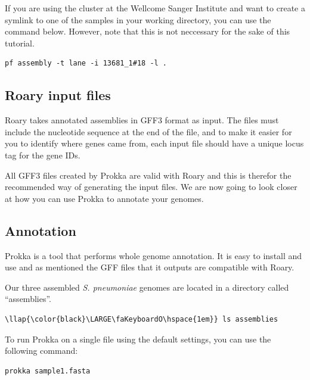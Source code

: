 \documentclass[11pt]{article}
\begin{document}
If you are using the cluster at the Wellcome Sanger Institute and want
to create a symlink to one of the samples in your working directory, you
can use the command below. However, note that this is not neccessary for
the sake of this tutorial.

\begin{verbatim}
pf assembly -t lane -i 13681_1#18 -l .
\end{verbatim}

\hypertarget{roary-input-files}{%
\subsection{Roary input files}\label{roary-input-files}}

Roary takes annotated assemblies in GFF3 format as input. The files must
include the nucleotide sequence at the end of the file, and to make it
easier for you to identify where genes came from, each input file should
have a unique locus tag for the gene IDs.

All GFF3 files created by Prokka are valid with Roary and this is
therefor the recommended way of generating the input files. We are now
going to look closer at how you can use Prokka to annotate your genomes.

\hypertarget{annotation}{%
\subsection{Annotation}\label{annotation}}

Prokka is a tool that performs whole genome annotation. It is easy to
install and use and as mentioned the GFF files that it outputs are
compatible with Roary.

Our three assembled \textit{S. pneumoniae} genomes are located in a
directory called ``assemblies''.

\begin{terminalinput}
\begin{Verbatim}[commandchars=\\\{\}]
\llap{\color{black}\LARGE\faKeyboardO\hspace{1em}} ls assemblies
\end{Verbatim}
\end{terminalinput}

    To run Prokka on a single file using the default settings, you can use
the following command:

\begin{verbatim}
prokka sample1.fasta
\end{verbatim}
\end{document}
